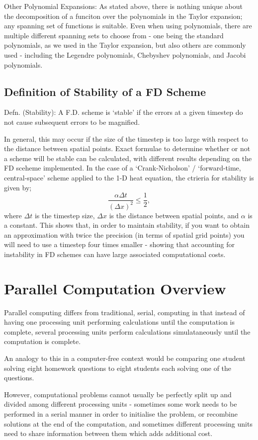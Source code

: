 Other Polynomial Expansions:
As stated above, there is nothing unique about the decomposition of a funciton over the polynomials in the Taylor expansion; any spanning set of functions is suitable. Even when using polynomials, there are multiple different spanning sets to choose from - one being the standard polynomials, as we used in the Taylor expansion, but also others are commonly used - including the Legendre polynomials, Chebyshev polynomials, and Jacobi polynomials.

\subsection{Definition of Stability of a FD Scheme}
Defn. (Stability): A F.D. scheme is `stable' if the errors at a given timestep do not cause subsequent errors to be magnified. 

In general, this may occur if the size of the timestep is too large with respect to the distance between spatial points. Exact formulae to determine whether or not a scheme will be stable can be calculated, with different results depending on the FD sceheme implemented. In the case of a `Crank-Nicholson' / `forward-time, central-space' scheme applied to the 1-D heat equation, the ctrieria for stability is given by;
$$
\frac{\alpha \Delta t}{(\Delta x)^{2}} \leq \frac{1}{2},
$$
where $\Delta t$ is the timestep size, $\Delta x$ is the distance between spatial points, and $\alpha$ is a constant. This shows that, in order to maintain stability, if you want to obtain an approximation with twice the precision (in terms of spatial grid points) you will need to use a timestep four times smaller - showing that accounting for instability in FD schemes can have large associated computational costs.

\section{Parallel Computation Overview}
Parallel computing differs from traditional, serial, computing in that instead of having one processing unit performing calculations until the computation is complete, several processing units perform calculations simulataneously until the computation is complete. 

An analogy to this in a computer-free context would be comparing one student solving eight homework questions to eight students each solving one of the questions. 

However, computational problems cannot usually be perfectly split up and divided among different processing units - sometimes some work needs to be performed in a serial manner in order to initialise the problem, or recombine solutions at the end of the computation, and sometimes different processing units need to share information between them which adds additional cost. 

